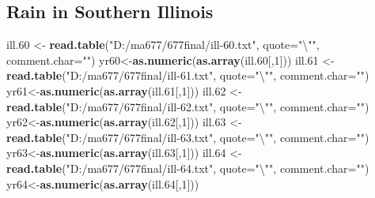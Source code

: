 \documentclass[]{article}
\newenvironment{Shaded}{\begin{snugshade}}{\end{snugshade}}
\newcommand{\KeywordTok}[1]{\textcolor[rgb]{0.13,0.29,0.53}{\textbf{#1}}}
\newcommand{\DataTypeTok}[1]{\textcolor[rgb]{0.13,0.29,0.53}{#1}}
\newcommand{\DecValTok}[1]{\textcolor[rgb]{0.00,0.00,0.81}{#1}}
\newcommand{\CharTok}[1]{\textcolor[rgb]{0.31,0.60,0.02}{#1}}
\newcommand{\StringTok}[1]{\textcolor[rgb]{0.31,0.60,0.02}{#1}}
\newcommand{\NormalTok}[1]{#1}
\begin{document}
\subsection{Rain in Southern Illinois}\label{rain-in-southern-illinois}

\begin{Shaded}
\begin{Highlighting}[]
\NormalTok{ill.}\DecValTok{60}\NormalTok{ <-}\StringTok{ }\KeywordTok{read.table}\NormalTok{(}\StringTok{"D:/ma677/677final/ill-60.txt"}\NormalTok{, }\DataTypeTok{quote=}\StringTok{"}\CharTok{\textbackslash{}"}\StringTok{"}\NormalTok{, }\DataTypeTok{comment.char=}\StringTok{""}\NormalTok{)}
\NormalTok{yr60<-}\KeywordTok{as.numeric}\NormalTok{(}\KeywordTok{as.array}\NormalTok{(ill.}\DecValTok{60}\NormalTok{[,}\DecValTok{1}\NormalTok{]))}
\NormalTok{ill.}\DecValTok{61}\NormalTok{ <-}\StringTok{ }\KeywordTok{read.table}\NormalTok{(}\StringTok{"D:/ma677/677final/ill-61.txt"}\NormalTok{, }\DataTypeTok{quote=}\StringTok{"}\CharTok{\textbackslash{}"}\StringTok{"}\NormalTok{, }\DataTypeTok{comment.char=}\StringTok{""}\NormalTok{)}
\NormalTok{yr61<-}\KeywordTok{as.numeric}\NormalTok{(}\KeywordTok{as.array}\NormalTok{(ill.}\DecValTok{61}\NormalTok{[,}\DecValTok{1}\NormalTok{]))}
\NormalTok{ill.}\DecValTok{62}\NormalTok{ <-}\StringTok{ }\KeywordTok{read.table}\NormalTok{(}\StringTok{"D:/ma677/677final/ill-62.txt"}\NormalTok{, }\DataTypeTok{quote=}\StringTok{"}\CharTok{\textbackslash{}"}\StringTok{"}\NormalTok{, }\DataTypeTok{comment.char=}\StringTok{""}\NormalTok{)}
\NormalTok{yr62<-}\KeywordTok{as.numeric}\NormalTok{(}\KeywordTok{as.array}\NormalTok{(ill.}\DecValTok{62}\NormalTok{[,}\DecValTok{1}\NormalTok{]))}
\NormalTok{ill.}\DecValTok{63}\NormalTok{ <-}\StringTok{ }\KeywordTok{read.table}\NormalTok{(}\StringTok{"D:/ma677/677final/ill-63.txt"}\NormalTok{, }\DataTypeTok{quote=}\StringTok{"}\CharTok{\textbackslash{}"}\StringTok{"}\NormalTok{, }\DataTypeTok{comment.char=}\StringTok{""}\NormalTok{)}
\NormalTok{yr63<-}\KeywordTok{as.numeric}\NormalTok{(}\KeywordTok{as.array}\NormalTok{(ill.}\DecValTok{63}\NormalTok{[,}\DecValTok{1}\NormalTok{]))}
\NormalTok{ill.}\DecValTok{64}\NormalTok{ <-}\StringTok{ }\KeywordTok{read.table}\NormalTok{(}\StringTok{"D:/ma677/677final/ill-64.txt"}\NormalTok{, }\DataTypeTok{quote=}\StringTok{"}\CharTok{\textbackslash{}"}\StringTok{"}\NormalTok{, }\DataTypeTok{comment.char=}\StringTok{""}\NormalTok{)}
\NormalTok{yr64<-}\KeywordTok{as.numeric}\NormalTok{(}\KeywordTok{as.array}\NormalTok{(ill.}\DecValTok{64}\NormalTok{[,}\DecValTok{1}\NormalTok{]))}
\end{Highlighting}
\end{Shaded}
\end{document}
